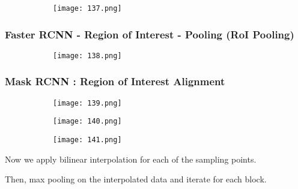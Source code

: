 \documentclass{article}
\begin{document}
\begin{figure}[ht!]
  \centering
  \begin{subfigure}[b]{0.4\linewidth}
    \texttt{[image: 137.png]}
  \end{subfigure}
\end{figure}

\subsubsection{Faster RCNN - Region of Interest - Pooling (RoI Pooling)}

\begin{figure}[ht!]
  \centering
  \begin{subfigure}[b]{0.7\linewidth}
    \texttt{[image: 138.png]}
  \end{subfigure}
\end{figure}

\subsubsection{Mask RCNN : Region of Interest Alignment}

\begin{figure}[ht!]
  \centering
  \begin{subfigure}[b]{0.7\linewidth}
    \texttt{[image: 139.png]}
  \end{subfigure}
\end{figure}

\begin{figure}[ht!]
  \centering
  \begin{subfigure}[b]{0.7\linewidth}
    \texttt{[image: 140.png]}
  \end{subfigure}
\end{figure}

\begin{figure}[ht!]
  \centering
  \begin{subfigure}[b]{0.8\linewidth}
    \texttt{[image: 141.png]}
  \end{subfigure}
\end{figure}

\vspace{20mm}

Now we apply bilinear interpolation for each of the sampling points.

Then, max pooling on the interpolated data and iterate for each block. 
\end{document}
